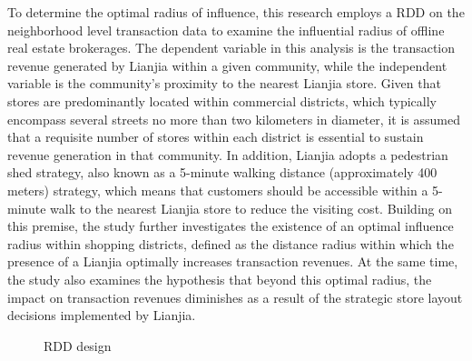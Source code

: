 \documentclass[11pt]{article}
\begin{document}
To determine the optimal radius of influence, this research employs a RDD on the neighborhood level transaction data to examine the influential radius of offline real estate brokerages. The dependent variable in this analysis is the transaction revenue generated by Lianjia within a given community, while the independent variable is the community's proximity to the nearest Lianjia store. Given that stores are predominantly located within commercial districts, which typically encompass several streets no more than two kilometers in diameter, it is assumed that a requisite number of stores within each district is essential to sustain revenue generation in that community. In addition, Lianjia adopts a pedestrian shed strategy, also known as a 5-minute walking distance (approximately 400 meters) strategy, which means that customers should be accessible within a 5-minute walk to the nearest Lianjia store to reduce the visiting cost. Building on this premise, the study further investigates the existence of an optimal influence radius within shopping districts, defined as the distance radius within which the presence of a Lianjia optimally increases transaction revenues. At the same time, the study also examines the hypothesis that beyond this optimal radius, the impact on transaction revenues diminishes as a result of the strategic store layout decisions implemented by Lianjia.

\begin{figure}[ht]
    \centering
    \hfill %
    \hfill %
    \caption{RDD design}
    \label{fig:RD_design}
\end{figure}
\end{document}
